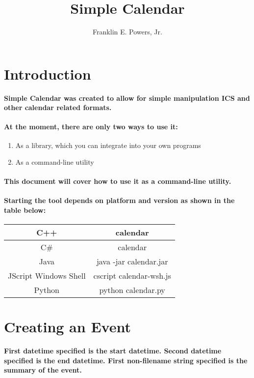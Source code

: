 \documentclass[11pt]{article}
\title{Simple Calendar}
\author{Franklin E. Powers, Jr.}
\begin{document}
\maketitle

\section{Introduction}

\paragraph{Simple Calendar was created to allow for simple manipulation ICS and other calendar related formats.}
\paragraph{At the moment, there are only two ways to use it:}
\begin{enumerate}
    \item As a library, which you can integrate into your own programs
    \item As a command-line utility
\end{enumerate}
\paragraph{This document will cover how to use it as a command-line utility.}
\paragraph{Starting the tool depends on platform and version as shown in the table below:}
\begin{center}
\begin{tabular}{ | c | c | }
\hline
C++ & calendar \\
\hline
C\# & calendar \\
\hline
Java & java -jar calendar.jar \\
\hline
JScript Windows Shell & cscript calendar-wsh.js \\
\hline
Python & python calendar.py \\
\hline
\end{tabular}
\end{center}

\section{Creating an Event}
\paragraph{First datetime specified is the start datetime.  Second datetime specified is the end datetime.  First non-filename string specified is the summary of the event.}
\end{document}
